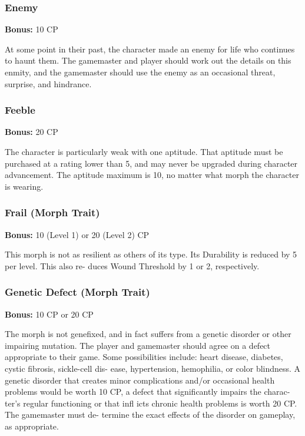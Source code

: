 \subsubsection{Enemy}

\textbf{Bonus:} 10 CP

At some point in their past, the character made 
an enemy for life who continues to haunt them. The 
gamemaster and player should work out the details on 
this enmity, and the gamemaster should use the enemy 
as an occasional threat, surprise, and hindrance.

\subsubsection{Feeble}

\textbf{Bonus:} 20 CP

The character is particularly weak with one aptitude. 
That aptitude must be purchased at a rating lower 
than 5, and may never be upgraded during character 
advancement. The aptitude maximum is 10, no matter 
what morph the character is wearing.

\subsubsection{Frail (Morph Trait)}

\textbf{Bonus:} 10 (Level 1) or 20 (Level 2) CP

This morph is not as resilient as others of its type. 
Its Durability is reduced by 5 per level. This also re-
duces Wound Threshold by 1 or 2, respectively.

\subsubsection{Genetic Defect (Morph Trait)}

\textbf{Bonus:} 10 CP or 20 CP

The morph is not genefixed, and in fact suffers 
from a genetic disorder or other impairing mutation. 
The player and gamemaster should agree on a defect 
appropriate to their game. Some possibilities include: 
heart disease, diabetes, cystic fibrosis, sickle-cell dis-
ease, hypertension, hemophilia, or color blindness. 
A genetic disorder that creates minor complications 
and/or occasional health problems would be worth 
10 CP, a defect that significantly impairs the charac-
ter's regular functioning or that infl icts chronic health 
problems is worth 20 CP. The gamemaster must de-
termine the exact effects of the disorder on gameplay, 
as appropriate.

